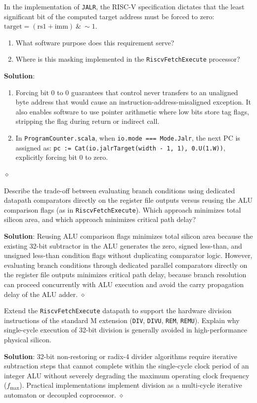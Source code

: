 \begin{problem}
In the implementation of \texttt{JALR}, the RISC-V specification dictates that the least significant bit of the computed target address must be forced to zero: $\text{target} = (\text{rs1} + \text{imm}) \ \& \ \sim 1$.
\begin{enumerate}
    \item What software purpose does this requirement serve?
    \item Where is this masking implemented in the \texttt{RiscvFetchExecute} processor?
\end{enumerate}

\textbf{Solution}:
\begin{enumerate}
    \item Forcing bit 0 to 0 guarantees that control never transfers to an unaligned byte address that would cause an instruction-address-misaligned exception. It also enables software to use pointer arithmetic where low bits store tag flags, stripping the flag during return or indirect call.
    \item In \texttt{ProgramCounter.scala}, when \texttt{io.mode === Mode.Jalr}, the next PC is assigned as:
    \texttt{pc := Cat(io.jalrTarget(width - 1, 1), 0.U(1.W))}, explicitly forcing bit 0 to zero.
\end{enumerate}
$\diamond$
\end{problem}

\begin{problem}
Describe the trade-off between evaluating branch conditions using dedicated datapath comparators directly on the register file outputs versus reusing the ALU comparison flags (as in \texttt{RiscvFetchExecute}). Which approach minimizes total silicon area, and which approach minimizes critical path delay?

\textbf{Solution}:
Reusing ALU comparison flags minimizes total silicon area because the existing 32-bit subtractor in the ALU generates the zero, signed less-than, and unsigned less-than condition flags without duplicating comparator logic. However, evaluating branch conditions through dedicated parallel comparators directly on the register file outputs minimizes critical path delay, because branch resolution can proceed concurrently with ALU execution and avoid the carry propagation delay of the ALU adder.
$\diamond$
\end{problem}

\begin{problem}
Extend the \texttt{RiscvFetchExecute} datapath to support the hardware division instructions of the standard M extension (\texttt{DIV}, \texttt{DIVU}, \texttt{REM}, \texttt{REMU}). Explain why single-cycle execution of 32-bit division is generally avoided in high-performance physical silicon.

\textbf{Solution}:
32-bit non-restoring or radix-4 divider algorithms require iterative subtraction steps that cannot complete within the single-cycle clock period of an integer ALU without severely degrading the maximum operating clock frequency ($f_{\text{max}}$). Practical implementations implement division as a multi-cycle iterative automaton or decoupled coprocessor.
$\diamond$
\end{problem}